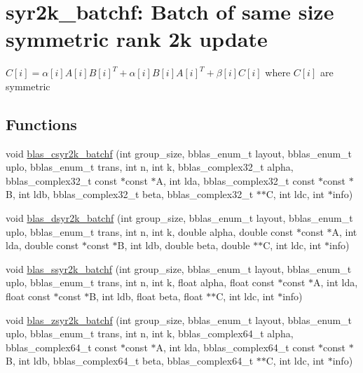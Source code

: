 \hypertarget{group__syr2k__batchf}{}\section{syr2k\+\_\+batchf\+: Batch of same size symmetric rank 2k update}
\label{group__syr2k__batchf}


$ C[i] = \alpha[i] A[i] B[i]^T + \alpha[i] B[i] A[i]^T + \beta[i] C[i] $ where $ C[i] $ are symmetric  


\subsection*{Functions}
\begin{DoxyCompactItemize}
\item 
void \mbox{\hyperlink{group__syr2k__batchf_ga33099f6c30809ceab9949f8d8b49ba0d}{blas\+\_\+csyr2k\+\_\+batchf}} (int group\+\_\+size, bblas\+\_\+enum\+\_\+t layout, bblas\+\_\+enum\+\_\+t uplo, bblas\+\_\+enum\+\_\+t trans, int n, int k, bblas\+\_\+complex32\+\_\+t alpha, bblas\+\_\+complex32\+\_\+t const $\ast$const $\ast$A, int lda, bblas\+\_\+complex32\+\_\+t const $\ast$const $\ast$B, int ldb, bblas\+\_\+complex32\+\_\+t beta, bblas\+\_\+complex32\+\_\+t $\ast$$\ast$C, int ldc, int $\ast$info)
\item 
void \mbox{\hyperlink{group__syr2k__batchf_gab280fe015e82c196cc9c20811a4df110}{blas\+\_\+dsyr2k\+\_\+batchf}} (int group\+\_\+size, bblas\+\_\+enum\+\_\+t layout, bblas\+\_\+enum\+\_\+t uplo, bblas\+\_\+enum\+\_\+t trans, int n, int k, double alpha, double const $\ast$const $\ast$A, int lda, double const $\ast$const $\ast$B, int ldb, double beta, double $\ast$$\ast$C, int ldc, int $\ast$info)
\item 
void \mbox{\hyperlink{group__syr2k__batchf_ga675940b5ea241293de1b9b363efe05ff}{blas\+\_\+ssyr2k\+\_\+batchf}} (int group\+\_\+size, bblas\+\_\+enum\+\_\+t layout, bblas\+\_\+enum\+\_\+t uplo, bblas\+\_\+enum\+\_\+t trans, int n, int k, float alpha, float const $\ast$const $\ast$A, int lda, float const $\ast$const $\ast$B, int ldb, float beta, float $\ast$$\ast$C, int ldc, int $\ast$info)
\item 
void \mbox{\hyperlink{group__syr2k__batchf_ga0da6e0560c631981925ab9da59ef8d16}{blas\+\_\+zsyr2k\+\_\+batchf}} (int group\+\_\+size, bblas\+\_\+enum\+\_\+t layout, bblas\+\_\+enum\+\_\+t uplo, bblas\+\_\+enum\+\_\+t trans, int n, int k, bblas\+\_\+complex64\+\_\+t alpha, bblas\+\_\+complex64\+\_\+t const $\ast$const $\ast$A, int lda, bblas\+\_\+complex64\+\_\+t const $\ast$const $\ast$B, int ldb, bblas\+\_\+complex64\+\_\+t beta, bblas\+\_\+complex64\+\_\+t $\ast$$\ast$C, int ldc, int $\ast$info)
\end{DoxyCompactItemize}


